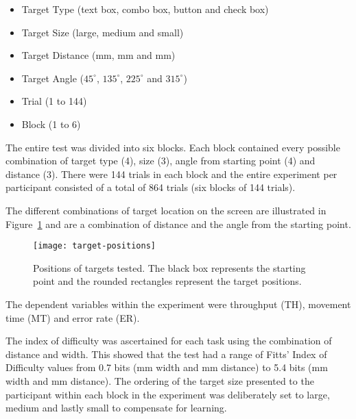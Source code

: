 \documentclass{elsart}
\begin{document}
\begin{itemize}

	\item Target Type (text box, combo box, button and check box)

	\item Target Size (large, medium and small)

	\item Target Distance (\unit[40]{mm}, \unit[80]{mm} and
	\unit[160]{mm})

	\item Target Angle (\(45^{\circ}\), \(135^{\circ}\), \(225^{\circ}\)
	and \(315^{\circ}\))

	\item Trial (1 to 144)

	\item Block (1 to 6)

\end{itemize}

The entire test was divided into six blocks. Each block contained every
possible combination of target type (4), size (3), angle from starting
point (4) and distance (3). There were 144 trials in each block and the
entire experiment per participant consisted of a total of 864 trials
(six blocks of 144 trials).

The different combinations of target location on the screen are
illustrated in Figure~\ref{fig-target-positions} and are a combination
of distance and the angle from the starting point.

\begin{figure}
	\texttt{[image: target-positions]}
	\caption{Positions of targets tested. The black box represents the
	starting point and the rounded rectangles represent the target
	positions.}
	\label{fig-target-positions}
\end{figure}


The dependent variables within the experiment were throughput (TH),
movement time (MT) and error rate (ER).

The index of difficulty was ascertained for each task using the
combination of distance and width. This showed that the test had a range
of Fitts' Index of Difficulty values from 0.7 bits (\unit[63]{mm} width
and \unit[160]{mm} distance) to 5.4 bits (\unit[4]{mm} width and
\unit[40]{mm} distance). The ordering of the target size presented to
the participant within each block in the experiment was deliberately set
to large, medium and lastly small to compensate for learning.
\end{document}
